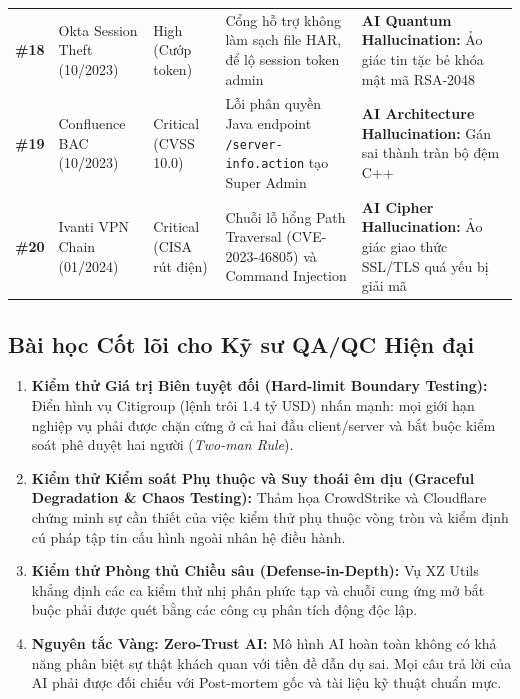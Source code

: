 \documentclass[11pt,a4paper]{article}
\newcommand{\filepath}[1]{\nolinkurl{#1}}
\begin{document}
\begin{xltabular}{\textwidth}{@{} c p{3.0cm} p{2.0cm} X X @{}}
\textbf{\#18} & Okta Session Theft (10/2023) & High (Cướp token) & Cổng hỗ trợ không làm sạch file HAR, để lộ session token admin & \textbf{AI Quantum Hallucination:} Ảo giác tin tặc bẻ khóa mật mã RSA-2048 \\
\textbf{\#19} & Confluence BAC (10/2023) & Critical (CVSS 10.0) & Lỗi phân quyền Java endpoint \filepath{/server-info.action} tạo Super Admin & \textbf{AI Architecture Hallucination:} Gán sai thành tràn bộ đệm C++ \\
\textbf{\#20} & Ivanti VPN Chain (01/2024) & Critical (CISA rút điện) & Chuỗi lỗ hổng Path Traversal (CVE-2023-46805) và Command Injection & \textbf{AI Cipher Hallucination:} Ảo giác giao thức SSL/TLS quá yếu bị giải mã \\
\end{xltabular}

\subsection{Bài học Cốt lõi cho Kỹ sư QA/QC Hiện đại}
\begin{enumerate}
    \item \textbf{Kiểm thử Giá trị Biên tuyệt đối (Hard-limit Boundary Testing):} Điển hình vụ Citigroup (lệnh trôi 1.4 tỷ USD) nhấn mạnh: mọi giới hạn nghiệp vụ phải được chặn cứng ở cả hai đầu client/server và bắt buộc kiểm soát phê duyệt hai người (\textit{Two-man Rule}).
    \item \textbf{Kiểm thử Kiểm soát Phụ thuộc và Suy thoái êm dịu (Graceful Degradation \& Chaos Testing):} Thảm họa CrowdStrike và Cloudflare chứng minh sự cần thiết của việc kiểm thử phụ thuộc vòng tròn và kiểm định cú pháp tập tin cấu hình ngoài nhân hệ điều hành.
    \item \textbf{Kiểm thử Phòng thủ Chiều sâu (Defense-in-Depth):} Vụ XZ Utils khẳng định các ca kiểm thử nhị phân phức tạp và chuỗi cung ứng mở bắt buộc phải được quét bằng các công cụ phân tích động độc lập.
    \item \textbf{Nguyên tắc Vàng: Zero-Trust AI:} Mô hình AI hoàn toàn không có khả năng phân biệt sự thật khách quan với tiền đề dẫn dụ sai. Mọi câu trả lời của AI phải được đối chiếu với Post-mortem gốc và tài liệu kỹ thuật chuẩn mực.
\end{enumerate}

\newpage
\end{document}
